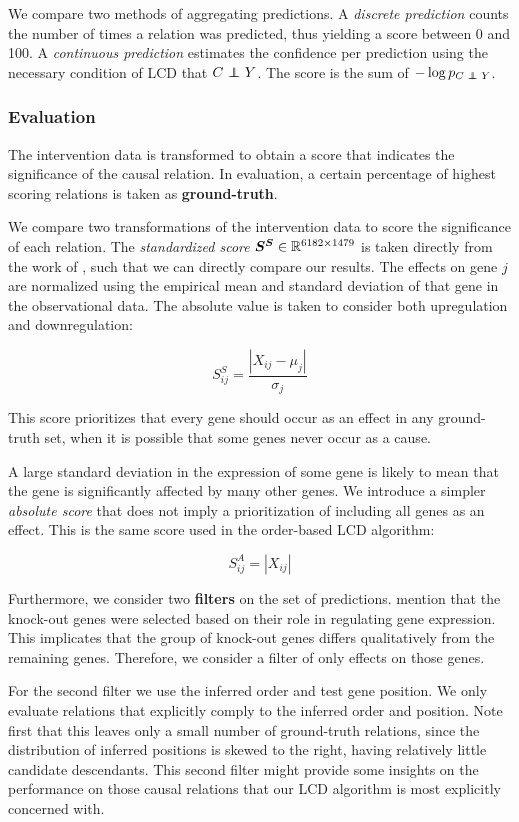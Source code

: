 We compare two methods of aggregating predictions. A \textit{discrete prediction} counts the number of times a relation was predicted, thus yielding a score between 0 and 100. A \textit{continuous prediction} estimates the confidence per prediction using the necessary condition of LCD that $C\operatorname*{{\,\perp\mkern-12mu\perp\,}} Y$. The score is the sum of $-\log p_{C\operatorname*{{\,\perp\mkern-12mu\perp\,}} Y}$.

\subsubsection{Evaluation}

The intervention data is transformed to obtain a score that indicates the significance of the causal relation. In evaluation, a certain percentage of highest scoring relations is taken as \textbf{ground-truth}. 

We compare two transformations of the intervention data to score the significance of each relation. The \textit{standardized score} $\bm{S^S}\in \mathbb{R}^{6182\times 1479}$ is taken directly from the work of \citet{versteeg2019boosting}, such that we can directly compare our results. The effects on gene $j$ are normalized using the empirical mean and standard deviation of that gene in the observational data. The absolute value is taken to consider both upregulation and downregulation:

$$
S^S_{ij}=\frac{|X_{ij}-\mu_j|}{\sigma_j}
$$

This score prioritizes that every gene should occur as an effect in any ground-truth set, when it is possible that some genes never occur as a cause.

A large standard deviation in the expression of some gene is likely to mean that the gene is significantly affected by many other genes. We introduce a simpler \textit{absolute score} that does not imply a prioritization of including all genes as an effect. This is the same score used in the order-based LCD algorithm:

$$
S^A_{ij}=|X_{ij}|
$$

Furthermore, we consider two \textbf{filters} on the set of predictions. \citet{kemmeren2014large} mention that the knock-out genes were selected based on their role in regulating gene expression. This implicates that the group of knock-out genes differs qualitatively from the remaining genes. Therefore, we consider a filter of only effects on those genes. 

For the second filter we use the inferred order and test gene position. We only evaluate relations that explicitly comply to the inferred order and position. Note first that this leaves only a small number of ground-truth relations, since the distribution of inferred positions is skewed to the right, having relatively little candidate descendants. This second filter might provide some insights on the performance on those causal relations that our LCD algorithm is most explicitly concerned with.

